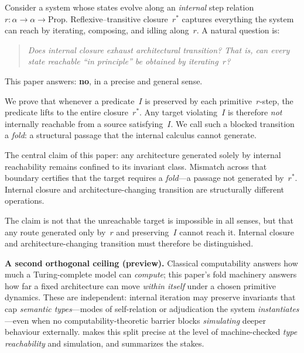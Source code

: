 \documentclass[11pt]{article}
\theoremstyle{plain}
\theoremstyle{definition}
\theoremstyle{remark}
\begin{document}
Consider a system whose states evolve along an \emph{internal} step relation
$r : \alpha \to \alpha \to \mathrm{Prop}$.  Reflexive--transitive closure~$r^{*}$
captures everything the system can reach by iterating, composing, and idling along~$r$.
A natural question is:

\begin{quote}
\emph{Does internal closure exhaust architectural transition?  That is, can every state
reachable ``in principle'' be obtained by iterating~$r$?}
\end{quote}

This paper answers: \textbf{no}, in a precise and general sense.

We prove that whenever a predicate~$I$ is preserved by each primitive~$r$-step, the
predicate lifts to the entire closure~$r^{*}$.  Any target violating~$I$ is therefore
\emph{not} internally reachable from a source satisfying~$I$.  We call such a blocked
transition a \emph{fold}: a structural passage that the internal calculus cannot
generate.

\begin{keybox}[title={A fold is not an iterate}]
The central claim of this paper: any architecture generated solely by internal
reachability remains confined to its invariant class.  Mismatch across that boundary
certifies that the target requires a \emph{fold}---a passage not generated by~$r^{*}$.
Internal closure and architecture-changing transition are structurally different
operations.
\end{keybox}

\noindent The claim is not that the unreachable target is impossible in all senses, but
that any route generated only by~$r$ and preserving~$I$ cannot reach it.  Internal
closure and architecture-changing transition must therefore be distinguished.

\medskip
\noindent
\textbf{A second orthogonal ceiling (preview).}
Classical computability answers how much a Turing-complete model can \emph{compute};
this paper's fold machinery answers how far a fixed architecture can move \emph{within
itself} under a chosen primitive dynamics.  These are independent: internal iteration may
preserve invariants that cap \emph{semantic types}---modes of self-relation or
adjudication the system \emph{instantiates}---even when no computability-theoretic barrier
blocks \emph{simulating} deeper behaviour externally.   makes this
split precise at the level of machine-checked \emph{type reachability} and simulation,
and  summarizes the stakes.
\end{document}
